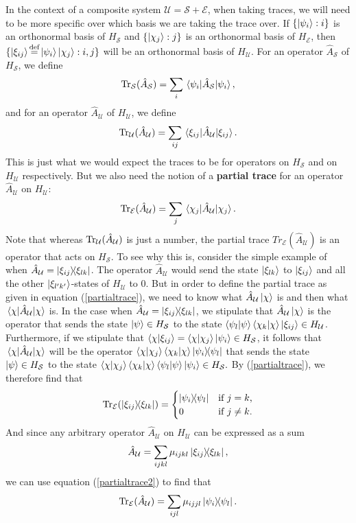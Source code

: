     In the context of a composite system $\mathcal{U}=\mathcal{S}+\mathcal{E}$, 
    when taking traces, we will need to be more specific over which basis we are taking the trace over. 
     If $\{\ket{\psi_i}:i\}$ is an orthonormal basis of $H_\mathcal{S}$ and $\{\ket{\chi_j}:j\}$ 
     is an orthonormal basis of $H_\mathcal{E}$, 
     then $\{\ket{\xi_{ij}}\myeq\ket{\psi_i}\ket{\chi_j}:i,j\}$ 
     will be an orthonormal basis of $H_\mathcal{U}$. 
     For an operator $\hat{A}_\mathcal{S}$ of $H_\mathcal{S}$, we define 
    $$\Tr_\mathcal{S}(\hat{A}_\mathcal{S})=\sum_i \ev*{\hat{A}_\mathcal{S}}{\psi_i},$$
     and for an operator $\hat{A}_\mathcal{U}$ of $H_\mathcal{U}$, we define 
     $$\Tr_\mathcal{U}(\hat{A}_\mathcal{U})=\sum_{ij} \ev*{\hat{A}_\mathcal{U}}{\xi_{ij}}.$$
    This is just what we would expect the traces to be for operators on $H_\mathcal{S}$ and on $H_\mathcal{U}$ respectively. But we also need the notion of a \textbf{partial trace} for an operator $\hat{A}_\mathcal{U}$ on $H_\mathcal{U}$: 
    \begin{equation}\label{partialtrace} \Tr_\mathcal{E}(\hat{A}_\mathcal{U})=\sum_j \ev*{\hat{A}_\mathcal{U}}{\chi_j}.\end{equation} 
    Note that whereas $\operatorname{Tr}_\mathcal{U}(\hat{A}_\mathcal{U})$ is just a number, the partial trace $Tr_\mathcal{E}(\hat{A}_\mathcal{U})$  is an operator that acts on $H_\mathcal{S}$. To see why this is, consider the simple example of when $\hat{A}_\mathcal{U}=\dyad{\xi_{ij}}{\xi_{lk}}$. The operator $\hat{A}_\mathcal{U}$ would send the state $\ket{\xi_{lk}}$ to $\ket{\xi_{ij}}$ and all the other $\ket{\xi_{l'k'}}$-states of $H_\mathcal{U}$ to $0$. But in order to define the partial trace as given in equation (\ref{partialtrace}), we need to know what $\hat{A}_\mathcal{U}\ket{\chi}$ is and then what $\ev*{\hat{A}_\mathcal{U}}{\chi}$ is. In the case when $\hat{A}_\mathcal{U}=\dyad{\xi_{ij}}{\xi_{lk}}$, we stipulate that $\hat{A}_\mathcal{U}\ket{\chi}$ is the operator that sends the state $\ket{\psi}\in H_\mathcal{S}$ to the state $\ip{\psi_l}{\psi}\ip{\chi_k}{\chi}\ket{\xi_{ij}}\in H_\mathcal{U}$.  Furthermore, if we stipulate that $\ip{\chi}{\xi_{ij}}=\ip{\chi}{\chi_j}\ket{\psi_i}\in H_\mathcal{S}$, it follows that $\ev*{\hat{A}_\mathcal{U}}{\chi}$ will be the operator $\ip{\chi}{\chi_j}\ip{\chi_k}{\chi}\dyad{\psi_i}{\psi_l}$ that sends  the state $\ket{\psi}\in H_\mathcal{S}$ to the state  $\ip{\chi}{\chi_j}\ip{\chi_k}{\chi}\ip{\psi_l}{\psi}\ket{\psi_i}\in H_\mathcal{S}.$ By (\ref{partialtrace}), we therefore find that
    \begin{equation} \label{partialtrace2}
    \Tr_\mathcal{E}(\dyad{\xi_{ij}}{\xi_{lk}})=
    \begin{cases} \dyad{\psi_i}{\psi_l} & \text{if $j=k$,} \\
    0 & \text{if $j\neq k$}.
    \end{cases}
    \end{equation}
    And since any arbitrary  operator $\hat{A}_\mathcal{U}$ on $H_\mathcal{U}$ can be expressed as a sum $$\hat{A}_\mathcal{U}=\sum_{ijkl}\mu_{ijkl}\dyad{\xi_{ij}}{\xi_{lk}},$$ we can use equation (\ref{partialtrace2}) to find that $$\Tr_\mathcal{E}(\hat{A}_\mathcal{U})=\sum_{ijl}\mu_{ijjl}\dyad{\psi_i}{\psi_l}.$$
    
